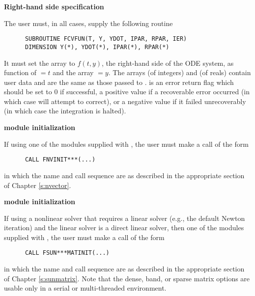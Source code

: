 \begin{Steps}
  
\item {\bf Right-hand side specification}
  
  The user must, in all cases, supply the following {\F} routine
\begin{verbatim}
      SUBROUTINE FCVFUN(T, Y, YDOT, IPAR, RPAR, IER)
      DIMENSION Y(*), YDOT(*), IPAR(*), RPAR(*)
\end{verbatim}
  It must set the  array to $f(t,y)$, the right-hand side of the ODE
  system, as function of $=t$ and the array $=y$.  
  The arrays  (of integers) and  (of reals) contain user data
  and are the same as those passed to .
   is an error return flag which should be set to $0$ if successful, a positive
  value if a recoverable error occurred (in which case {\cvode} will attempt to correct), 
  or a negative value if it failed unrecoverably (in which case the integration is 
  halted).

\item  {\bf {\nvector} module initialization}

  If using one of the {\nvector} modules supplied with {\sundials},
  the user must make a call of the form
\begin{verbatim}
      CALL FNVINIT***(...)
\end{verbatim}
in which the name and call sequence are as described in the appropriate
section of Chapter \ref{s:nvector}.

\item\label{i:fcv_matrix_init} {\bf {\sunmatrix} module initialization}

  If using a nonlinear solver that requires a linear solver (e.g., the default
  Newton iteration) and the linear solver is a direct linear solver, then
  one of the {\sunmatrix} modules supplied with {\sundials}, 
  the user must make a call of the form
\begin{verbatim}
      CALL FSUN***MATINIT(...)
\end{verbatim}
in which the name and call sequence are as described in the appropriate
section of Chapter \ref{s:sunmatrix}.  Note that the dense, band, or
sparse matrix options are usable only in a serial or multi-threaded
environment. 



\end{Steps}
